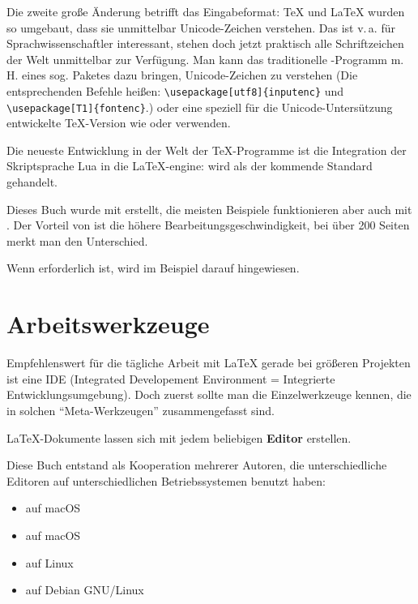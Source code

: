 Die zweite große Änderung betrifft das Eingabeformat:
\TeX{} und \LaTeX{} wurden so umgebaut, dass sie unmittelbar Unicode-Zeichen verstehen.
Das ist v.\,a. für Sprachwissenschaftler interessant, stehen doch jetzt praktisch alle Schriftzeichen
der Welt unmittelbar zur Verfügung. 
Man kann das traditionelle \pdfLaTeX-Programm m.\,H. eines sog. Paketes dazu bringen, Unicode-Zeichen
zu verstehen
(Die entsprechenden Befehle heißen: \lstinline/\usepackage[utf8]{inputenc}/ 
und \lstinline/\usepackage[T1]{fontenc}/.)
oder eine speziell für die Unicode-Untersützung entwickelte \TeX{}-Version wie \XeLaTeX{} 
oder \LuaLaTeX{} verwenden.

Die neueste Entwicklung in der Welt der \TeX-Programme ist die Integration der Skriptsprache
Lua in die \LaTeX-engine: \LuaLaTeX{} wird als der kommende Standard gehandelt.

Dieses Buch wurde mit \LuaLaTeX{} erstellt, die meisten Beispiele funktionieren aber auch mit \pdfLaTeX{}.
Der Vorteil von \pdfLaTeX{} ist die höhere Bearbeitungsgeschwindigkeit, bei über 200 Seiten merkt man
den Unterschied.

Wenn \LuaLaTeX{} erforderlich ist, wird im Beispiel darauf hingewiesen.

\section{Arbeitswerkzeuge}

Empfehlenswert für die tägliche Arbeit mit \LaTeX{} gerade bei größeren Projekten ist eine 
IDE (Integrated Developement Environment = Integrierte Entwicklungsumgebung).
Doch zuerst sollte man die Einzelwerkzeuge kennen, die in solchen \enquote{Meta-Werkzeugen}
zusammengefasst sind.


\LaTeX{}-Dokumente lassen sich mit jedem beliebigen \textbf{Editor} erstellen.

Diese Buch entstand als Kooperation mehrerer Autoren, die unterschiedliche Editoren
auf unterschiedlichen Betriebssystemen benutzt haben:

\begin{itemize}
\item {} auf macOS
\item {} auf macOS
\item {} auf Linux
\item {} auf Debian GNU/Linux
\end{itemize}


